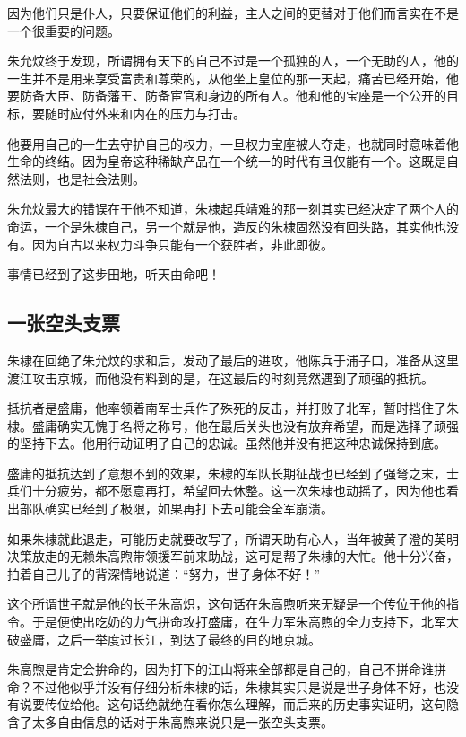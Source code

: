 \begin{multicols}{\theparacolNo}
		因为他们只是仆人，只要保证他们的利益，主人之间的更替对于他们而言实在不是一个很重要的问题。

		朱允炆终于发现，所谓拥有天下的自己不过是一个孤独的人，一个无助的人，他的一生并不是用来享受富贵和尊荣的，从他坐上皇位的那一天起，痛苦已经开始，他要防备大臣、防备藩王、防备宦官和身边的所有人。他和他的宝座是一个公开的目标，要随时应付外来和内在的压力与打击。

		他要用自己的一生去守护自己的权力，一旦权力宝座被人夺走，也就同时意味着他生命的终结。因为皇帝这种稀缺产品在一个统一的时代有且仅能有一个。这既是自然法则，也是社会法则。

		朱允炆最大的错误在于他不知道，朱棣起兵靖难的那一刻其实已经决定了两个人的命运，一个是朱棣自己，另一个就是他，造反的朱棣固然没有回头路，其实他也没有。因为自古以来权力斗争只能有一个获胜者，非此即彼。

		事情已经到了这步田地，听天由命吧！

		\subsection{一张空头支票}
		朱棣在回绝了朱允炆的求和后，发动了最后的进攻，他陈兵于浦子口，准备从这里渡江攻击京城，而他没有料到的是，在这最后的时刻竟然遇到了顽强的抵抗。

		抵抗者是盛庸，他率领着南军士兵作了殊死的反击，并打败了北军，暂时挡住了朱棣。盛庸确实无愧于名将之称号，他在最后关头也没有放弃希望，而是选择了顽强的坚持下去。他用行动证明了自己的忠诚。虽然他并没有把这种忠诚保持到底。

		盛庸的抵抗达到了意想不到的效果，朱棣的军队长期征战也已经到了强弩之末，士兵们十分疲劳，都不愿意再打，希望回去休整。这一次朱棣也动摇了，因为他也看出部队确实已经到了极限，如果再打下去可能会全军崩溃。

		如果朱棣就此退走，可能历史就要改写了，所谓天助有心人，当年被黄子澄的英明决策放走的无赖朱高煦带领援军前来助战，这可是帮了朱棣的大忙。他十分兴奋，拍着自己儿子的背深情地说道：“努力，世子身体不好！”

		这个所谓世子就是他的长子朱高炽，这句话在朱高煦听来无疑是一个传位于他的指令。于是便使出吃奶的力气拼命攻打盛庸，在生力军朱高煦的全力支持下，北军大破盛庸，之后一举度过长江，到达了最终的目的地京城。

		朱高煦是肯定会拚命的，因为打下的江山将来全部都是自己的，自己不拼命谁拼命？不过他似乎并没有仔细分析朱棣的话，朱棣其实只是说是世子身体不好，也没有说要传位给他。这句话绝就绝在看你怎么理解，而后来的历史事实证明，这句隐含了太多自由信息的话对于朱高煦来说只是一张空头支票。


\end{multicols}
